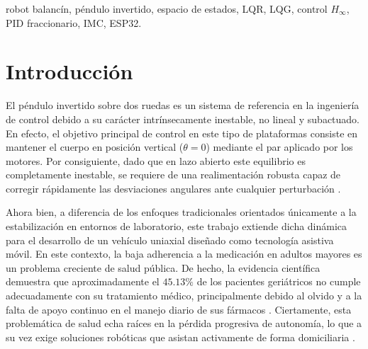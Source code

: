\documentclass[conference]{IEEEtran}
\begin{document}
\maketitle
\begin{abstract}
Se presenta el modelado, dise\~no e implementaci\'on experimental de seis
estrategias de control para estabilizar un veh\'iculo uniaxial tipo robot
balanc\'in, modelado como un p\'endulo invertido sobre dos ruedas. Sobre una
misma planta identificada en espacio de estados (polo inestable en
$+10.23~\mathrm{rad/s}$) se dise\~naron controladores LQR, LQG, control en
cascada por colocaci\'on de polos, PID de orden fraccionario (FOPID), control
robusto por modelo interno (IMC) y control $H_\infty$. Todos se implementaron en
un microcontrolador ESP32-S3 a $100~\mathrm{Hz}$ y se compararon con criterios de
estabilidad, sobrepaso, tiempo de establecimiento, valor RMS del \'angulo y
esfuerzo de control, contrastando la simulaci\'on con la data experimental
extra\'ida en lazo cerrado. Los seis controladores estabilizan el robot con error
angular sub-grado; el control en cascada corregido obtuvo el mejor desempe\~no
($\theta_{RMS}=0.19^\circ$) con el menor esfuerzo de control.
\end{abstract}

\begin{IEEEkeywords}
robot balanc\'in, p\'endulo invertido, espacio de estados, LQR, LQG, control
$H_\infty$, PID fraccionario, IMC, ESP32.
\end{IEEEkeywords}

\section{Introducción}
El péndulo invertido sobre dos ruedas es un sistema de referencia en la ingeniería de control debido a su carácter intrínsecamente inestable, no lineal y subactuado. En efecto, el objetivo principal de control en este tipo de plataformas consiste en mantener el cuerpo en posición vertical ($\theta=0$) mediante el par aplicado por los motores. Por consiguiente, dado que en lazo abierto este equilibrio es completamente inestable, se requiere de una realimentación robusta capaz de corregir rápidamente las desviaciones angulares ante cualquier perturbación \cite{gainscheduled2026, le-twipr2025}.

Ahora bien, a diferencia de los enfoques tradicionales orientados únicamente a la estabilización en entornos de laboratorio, este trabajo extiende dicha dinámica para el desarrollo de un vehículo uniaxial diseñado como tecnología asistiva móvil. En este contexto, la baja adherencia a la medicación en adultos mayores es un problema creciente de salud pública. De hecho, la evidencia científica demuestra que aproximadamente el $45.13\%$ de los pacientes geriátricos no cumple adecuadamente con su tratamiento médico, principalmente debido al olvido y a la falta de apoyo continuo en el manejo diario de sus fármacos \cite{mohamed2022}. Ciertamente, esta problemática de salud echa raíces en la pérdida progresiva de autonomía, lo que a su vez exige soluciones robóticas que asistan activamente de forma domiciliaria \cite{walker2016, dec_multiloop2021}.
\end{document}
